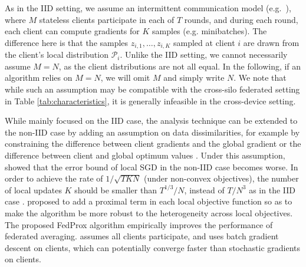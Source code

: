 As in the IID setting, we assume an intermittent communication model (e.g.\ \citet[Sec. 4.4]{woodworth18graphoracle}), where $M$ stateless clients participate in each of $T$ rounds, and during each round, each client can compute gradients for $K$ samples (e.g. minibatches). The difference here is that the samples $z_{i, 1}, \ldots, z_{i, K}$ sampled at client $i$ are drawn from the client's local distribution $\mathcal{P}_i$. Unlike the IID setting, we cannot necessarily assume $M = N$, as the client distributions are not all equal. In the following, if an algorithm relies on $M = N$, we will omit $M$ and simply write $N$. We note that while such an assumption may be compatible with the cross-silo federated setting in Table \ref{tab:characteristics}, it is generally infeasible in the cross-device setting.

While \citep{stich2018local,yu2018parallel,wang2018cooperative,stich2019error} mainly focused on the IID case, the analysis technique can be extended to the non-IID case by adding an assumption on data dissimilarities, for example by constraining the difference between client gradients and the global gradient \citep{Lian2017b,li2018federated,li2019communication,wang2019matcha,wang2020tackling} or the difference between client and global optimum values \citep{li2019convergence,khaled2019analysis}. Under this assumption, \citet{yu2019linear} showed that the error bound of local SGD in the non-IID case becomes worse. In order to achieve the rate of $1/\sqrt{TKN}$ (under non-convex objectives), the number of local updates $K$ should be smaller than $T^{1/3}/N$, instead of $T/N^3$
as in the IID case \cite{wang2018cooperative}. \citet{li2018federated} proposed to add a proximal term in each local objective function so as to make the algorithm be more robust to the heterogeneity across local objectives. The proposed FedProx algorithm empirically improves the performance of federated averaging. 
\citet{khaled2019analysis}  assumes all clients participate, and uses batch gradient descent on clients, which can potentially converge faster than stochastic gradients on clients.  

